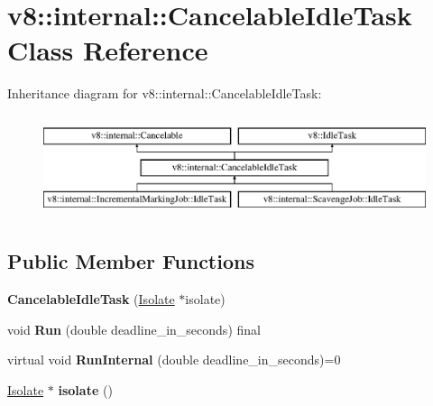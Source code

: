\hypertarget{classv8_1_1internal_1_1_cancelable_idle_task}{}\section{v8\+:\+:internal\+:\+:Cancelable\+Idle\+Task Class Reference}
\label{classv8_1_1internal_1_1_cancelable_idle_task}
Inheritance diagram for v8\+:\+:internal\+:\+:Cancelable\+Idle\+Task\+:\begin{figure}[H]
\begin{center}
\leavevmode
\includegraphics[height=3.000000cm]{classv8_1_1internal_1_1_cancelable_idle_task}
\end{center}
\end{figure}
\subsection*{Public Member Functions}
\begin{DoxyCompactItemize}
\item 
{\bfseries Cancelable\+Idle\+Task} (\hyperlink{classv8_1_1internal_1_1_isolate}{Isolate} $\ast$isolate)\hypertarget{classv8_1_1internal_1_1_cancelable_idle_task_acbb0dedd9f04f088645791a17caa264c}{}\label{classv8_1_1internal_1_1_cancelable_idle_task_acbb0dedd9f04f088645791a17caa264c}

\item 
void {\bfseries Run} (double deadline\+\_\+in\+\_\+seconds) final\hypertarget{classv8_1_1internal_1_1_cancelable_idle_task_aff0b5c4a4de191ea68a38bb38e238275}{}\label{classv8_1_1internal_1_1_cancelable_idle_task_aff0b5c4a4de191ea68a38bb38e238275}

\item 
virtual void {\bfseries Run\+Internal} (double deadline\+\_\+in\+\_\+seconds)=0\hypertarget{classv8_1_1internal_1_1_cancelable_idle_task_a7f00974650eae0763c79a6aef2a73ab5}{}\label{classv8_1_1internal_1_1_cancelable_idle_task_a7f00974650eae0763c79a6aef2a73ab5}

\item 
\hyperlink{classv8_1_1internal_1_1_isolate}{Isolate} $\ast$ {\bfseries isolate} ()\hypertarget{classv8_1_1internal_1_1_cancelable_idle_task_a834cdcc17b8628861bf86db8d2b56b1f}{}\label{classv8_1_1internal_1_1_cancelable_idle_task_a834cdcc17b8628861bf86db8d2b56b1f}

\end{DoxyCompactItemize}
